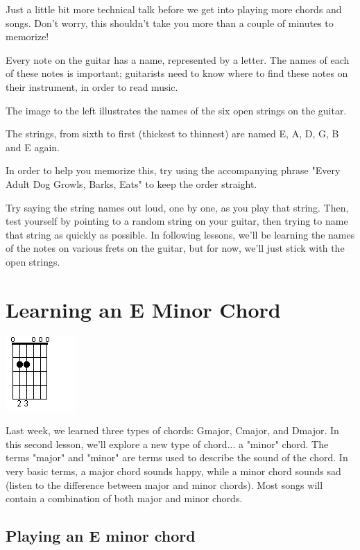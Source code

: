 Just a little bit more technical talk before we get into playing more chords and songs. Don't worry, this shouldn't take you more than a couple of minutes to memorize!

Every note on the guitar has a name, represented by a letter. The names of each of these notes is important; guitarists need to know where to find these notes on their instrument, in order to read music.

The image to the left illustrates the names of the six open strings on the guitar.

The strings, from sixth to first (thickest to thinnest) are named E, A, D, G, B and E again.

In order to help you memorize this, try using the accompanying phrase "Every Adult Dog Growls, Barks, Eats" to keep the order straight.

Try saying the string names out loud, one by one, as you play that string. Then, test yourself by pointing to a random string on your guitar, then trying to name that string as quickly as possible. In following lessons, we'll be learning the names of the notes on various frets on the guitar, but for now, we'll just stick with the open strings.

\section{Learning an E Minor Chord}
\includegraphics{parttwo/openeminor.png}

Last week, we learned three types of chords: Gmajor, Cmajor, and Dmajor. In this second lesson, we'll explore a new type of chord... a "minor" chord. The terms "major" and "minor" are terms used to describe the sound of the chord. In very basic terms, a major chord sounds happy, while a minor chord sounds sad (listen to the difference between major and minor chords). Most songs will contain a combination of both major and minor chords.

\subsection{Playing an E minor chord}

